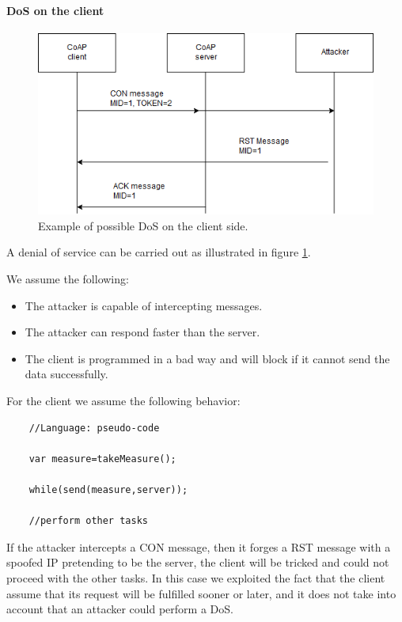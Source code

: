 	\paragraph{DoS on the client}
	\begin{figure}
		\includegraphics[width=\linewidth]{coap-vuln-img0.png}
		\caption{Example of possible DoS on the client side.}
		\label{fig:coap-vuln0}
	\end{figure}
	A denial of service can be carried out as illustrated in figure \ref{fig:coap-vuln0}.\newline
	
	We assume the following:
	\begin{itemize}
		\item The attacker is capable of intercepting messages.
		\item The attacker can respond faster than the server.
		\item The client is programmed in a bad way and will block if it cannot send the data successfully.
	\end{itemize}

	For the client we assume the following behavior:
	\begin{lstlisting}
	//Language: pseudo-code
	
	var measure=takeMeasure();
	
	while(send(measure,server));
	
	//perform other tasks
	\end{lstlisting}
	
	If the attacker intercepts a CON message, then it forges a RST message with a spoofed IP pretending to be the server, the client will be tricked and could not proceed with the other tasks.\newline
	In this case we exploited the fact that the client assume that its request will be fulfilled sooner or later, and it does not take into account that an attacker could perform a DoS.\newline
	
